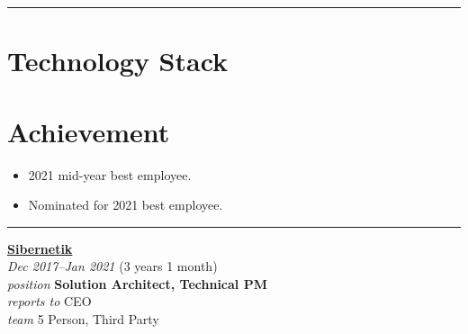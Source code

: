 \documentclass[12pt]{res}
\begin{document}
\begin{resume}
\vspace{-20pt}
\begin{minipage}[t]{0.55\linewidth}
	\rule{0.25\textwidth}{2pt}
	\begin{multicols}{2}
		\section{Technology Stack}
		\columnbreak
		\section{}
	\end{multicols}
	\vspace{1pt}
\end{minipage}
\hfill
\begin{minipage}[t]{0.42\linewidth}
	\vspace{18pt}
	\section{Achievement}
	\begin{flushleft}
        \footnotesize{\begin{itemize}
\item 2021 mid-year best employee.
\item Nominated for 2021 best employee.
\end{itemize}}
	\end{flushleft}
\end{minipage}

\vspace{10pt}
\rule{1.0\textwidth}{0.1pt}

\begin{multicols}{2}
	{\large {\bf \href{https://sibernetik.co.id}{Sibernetik}}} \\
	{\footnotesize{\sl Dec 2017--Jan 2021} \hfill (3 years 1 month)}\\
	{\footnotesize{\sl position} \hfill \bf{Solution Architect, Technical PM}}\\
	{\footnotesize{\sl reports to} \hfill CEO}\\
	{\footnotesize{\sl team} \hfill 5 Person, Third Party}\\


\end{multicols}
\end{resume}
\end{document}
